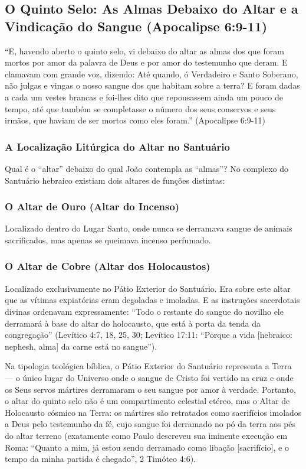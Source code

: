 \documentclass[11pt,a4paper,openany]{book}
\begin{document}
\subsection{O Quinto Selo: As Almas Debaixo do Altar e a Vindicação do Sangue (Apocalipse 6:9-11)}


``E, havendo aberto o quinto selo, vi debaixo do altar as almas dos que foram mortos por amor da palavra de Deus e por amor do testemunho que deram. E clamavam com grande voz, dizendo: Até quando, ó Verdadeiro e Santo Soberano, não julgas e vingas o nosso sangue dos que habitam sobre a terra? E foram dadas a cada um vestes brancas e foi-lhes dito que repousassem ainda um pouco de tempo, até que também se completasse o número dos seus conservos e seus irmãos, que haviam de ser mortos como eles foram.'' (Apocalipse 6:9-11)


\subsubsection*{A Localização Litúrgica do Altar no Santuário}
Qual é o ``altar'' debaixo do qual João contempla as ``almas''? No complexo do Santuário hebraico existiam dois altares de funções distintas:

\subsubsection*{O Altar de Ouro (Altar do Incenso)}
Localizado dentro do Lugar Santo, onde nunca se derramava sangue de animais sacrificados, mas apenas se queimava incenso perfumado.

\subsubsection*{O Altar de Cobre (Altar dos Holocaustos)}
Localizado exclusivamente no Pátio Exterior do Santuário. Era sobre este altar que as vítimas expiatórias eram degoladas e imoladas. E as instruções sacerdotais divinas ordenavam expressamente: ``Todo o restante do sangue do novilho ele derramará à base do altar do holocausto, que está à porta da tenda da congregação'' (Levítico 4:7, 18, 25, 30; Levítico 17:11: ``Porque a vida [hebraico: nephesh, alma] da carne está no sangue'').

Na tipologia teológica bíblica, o Pátio Exterior do Santuário representa a Terra — o único lugar do Universo onde o sangue de Cristo foi vertido na cruz e onde os Seus servos mártires derramaram o seu sangue por amor à verdade. Portanto, o altar do quinto selo não é um compartimento celestial etéreo, mas o Altar de Holocausto cósmico na Terra: os mártires são retratados como sacrifícios imolados a Deus pelo testemunho da fé, cujo sangue foi derramado no pó da terra aos pés do altar terreno (exatamente como Paulo descreveu sua iminente execução em Roma: ``Quanto a mim, já estou sendo derramado como libação [sacrifício], e o tempo da minha partida é chegado'', 2 Timóteo 4:6).
\end{document}
